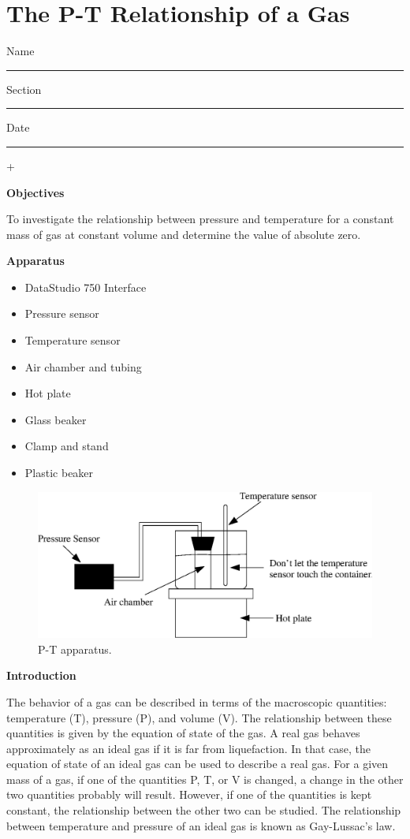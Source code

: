 
\section{The P-T Relationship of a Gas}

Name \rule{2.0in}{0.1pt}\hfill{}Section \rule{1.0in}{0.1pt}\hfill{}Date
\rule{1.0in}{0.1pt}+

\textbf{Objectives} 

To investigate the relationship between pressure and temperature for
a constant mass of gas at constant volume and determine the value
of absolute zero.

\textbf{Apparatus} 

\begin{itemize}
\item DataStudio 750 Interface
\item Pressure sensor
\item Temperature sensor
\item Air chamber and tubing
\item Hot plate
\item Glass beaker
\item Clamp and stand
\item Plastic beaker
\end{itemize}
\vspace{0.3cm}

\begin{figure}[hbt]
\begin{center}
\includegraphics[width=6.0in]{P-T_relationship_of_gas/P-T_fig1b.eps}
\caption{P-T apparatus.}
\end{center}
\end{figure}

\textbf{Introduction}

The behavior of a gas can be described in terms of the macroscopic quantities:
temperature (T), pressure (P), and volume (V). The relationship between these
quantities is given by the equation of state of the gas. A real gas behaves
approximately as an ideal gas if it is far from liquefaction. In that case,
the equation of state of an ideal gas can be used to describe a real gas. For
a given mass of a gas, if one of the quantities P, T, or V is changed, a change
in the other two quantities probably will result. However, if one of the 
quantities is kept constant, the relationship between the other two can be 
studied. The relationship between temperature and pressure of an ideal gas is 
known as Gay-Lussac's law.


